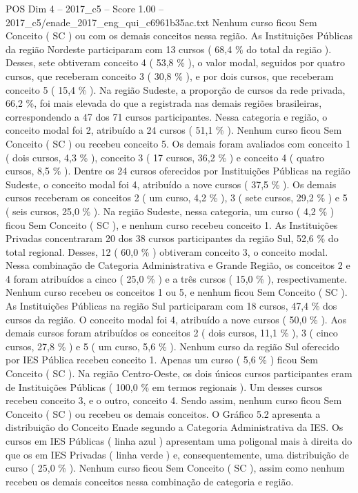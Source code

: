 \begin{textsample}{POS Dim 4 – 2017\_c5 – Score 1.00 – 2017\_c5/enade\_2017\_eng\_qui\_c6961b35ac.txt}
Nenhum curso ficou Sem Conceito ( SC ) ou com os demais conceitos nessa região.
As Instituições Públicas da região Nordeste participaram com 13 cursos ( 68,4 \% do total da região ).
Desses, sete obtiveram conceito 4 ( 53,8 \% ), o valor modal, seguidos por quatro cursos, que receberam conceito 3 ( 30,8 \% ), e por dois cursos, que receberam conceito 5 ( 15,4 \% ).
Na região Sudeste, a proporção de cursos da rede privada, 66,2 \%, foi mais elevada do que a registrada nas demais regiões brasileiras, correspondendo a 47 dos 71 cursos participantes.
Nessa categoria e região, o conceito modal foi 2, atribuído a 24 cursos ( 51,1 \% ).
Nenhum curso ficou Sem Conceito ( SC ) ou recebeu conceito 5.
Os demais foram avaliados com conceito 1 ( dois cursos, 4,3 \% ), conceito 3 ( 17 cursos, 36,2 \% ) e conceito 4 ( quatro cursos, 8,5 \% ).
Dentre os 24 cursos oferecidos por Instituições Públicas na região Sudeste, o conceito modal foi 4, atribuído a nove cursos ( 37,5 \% ).
Os demais cursos receberam os conceitos 2 ( um curso, 4,2 \% ), 3 ( sete cursos, 29,2 \% ) e 5 ( seis cursos, 25,0 \% ).
Na região Sudeste, nessa categoria, um curso ( 4,2 \% ) ficou Sem Conceito ( SC ), e nenhum curso recebeu conceito 1.
As Instituições Privadas concentraram 20 dos 38 cursos participantes da região Sul, 52,6 \% do total regional.
Desses, 12 ( 60,0 \% ) obtiveram conceito 3, o conceito modal.
Nessa combinação de Categoria Administrativa e Grande Região, os conceitos 2 e 4 foram atribuídos a cinco ( 25,0 \% ) e a três cursos ( 15,0 \% ), respectivamente.
Nenhum curso recebeu os conceitos 1 ou 5, e nenhum ficou Sem Conceito ( SC ).
As Instituições Públicas na região Sul participaram com 18 cursos, 47,4 \% dos cursos da região.
O conceito modal foi 4, atribuído a nove cursos ( 50,0 \% ).
Aos demais cursos foram atribuídos os conceitos 2 ( dois cursos, 11,1 \% ), 3 ( cinco cursos, 27,8 \% ) e 5 ( um curso, 5,6 \% ).
Nenhum curso da região Sul oferecido por IES Pública recebeu conceito 1.
Apenas um curso ( 5,6 \% ) ficou Sem Conceito ( SC ).
Na região Centro-Oeste, os dois únicos cursos participantes eram de Instituições Públicas ( 100,0 \% em termos regionais ).
Um desses cursos recebeu conceito 3, e o outro, conceito 4.
Sendo assim, nenhum curso ficou Sem Conceito ( SC ) ou recebeu os demais conceitos.
O Gráfico 5.2 apresenta a distribuição do Conceito Enade segundo a Categoria Administrativa da IES.
Os cursos em IES Públicas ( linha azul ) apresentam uma poligonal mais à direita do que os em IES Privadas ( linha verde ) e, consequentemente, uma distribuição de curso ( 25,0 \% ).
Nenhum curso ficou Sem Conceito ( SC ), assim como nenhum recebeu os demais conceitos nessa combinação de categoria e região.

\end{textsample}
